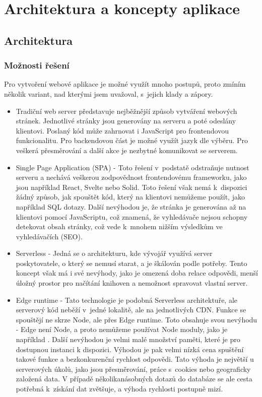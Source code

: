 \documentclass[12pt, a4paper,
openright
]{report}
\let\oldchapter\chapter
\renewcommand{\chapter}{
	\clearpage
	\pagestyle{fancy}
	\oldchapter
}
\begin{document}
\chapter{Architektura a koncepty aplikace}

\section{Architektura}

\subsection{Možnosti řešení}
Pro vytvoření webové aplikace je možné využít mnoho postupů, proto zmíním několik variant, nad kterými jsem uvažoval, s~jejich klady a zápory.

\begin{itemize}
\item Tradiční web server představuje nejběžnější způsob vytváření webových stránek. Jednotlivé stránky jsou generovány na serveru a poté odeslány klientovi. Poslaný kód může zahrnovat i JavaScript pro frontendovou funkcionalitu. Pro backendovou část je možné využít jazyk dle výběru. Pro veškerá přesměrování a další akce je nezbytné komunikovat se serverem.

\item Single Page Application (SPA) - Toto řešení v~podstatě odstraňuje nutnost serveru a nechává veškerou zodpovědnost frontendovému frameworku, jako jsou například React, Svelte nebo Solid. Toto řešení však nemá k~dispozici žádný způsob, jak spouštět kód, který na klientovi nemůžeme použít, jako například SQL dotazy. Další nevýhodou je, že stránka je generována až na klientovi pomocí JavaScriptu, což znamená, že vyhledávače nejsou schopny detekovat obsah stránky, což vede k~mnohem nižším výsledkům ve vyhledávačích (SEO).

\item Serverless - Jedná se o architekturu, kde vývojář využívá server poskytovatele, o který se nemusí starat, a je škálován podle potřeby. Tento koncept však má i své nevýhody, jako je omezená doba relace odpovědi, menší úložný prostor pro načítání knihoven a nemožnost spravovat vlastní server.

\item Edge runtime - Tato technologie je podobná Serverless architektuře, ale serverový kód neběží v~jedné lokalitě, ale na jednotlivých CDN. Funkce se spouštějí ne skrze Node, ale přes Edge runtime. Toto obsahuje svou nevýhodu - Edge není Node, a proto nemůžeme používat Node moduly, jako je například . Další nevýhodou je velmi malé množství paměti, které je pro dostupnou instanci k dispozici. Výhodou je pak velmi nízká cena spuštění takové funkce a bezkonkurenční rychlost odpovědi. Tato výhoda je největší u serverových úkolů, jako jsou přesměrování, práce s~cookies nebo geograficky založená data. V případě několikanásobných dotazů do databáze se ale cesta potřebná k~získání dat zvětšuje, a výhoda rychlosti postupně mizí.


\end{itemize}
\end{document}

